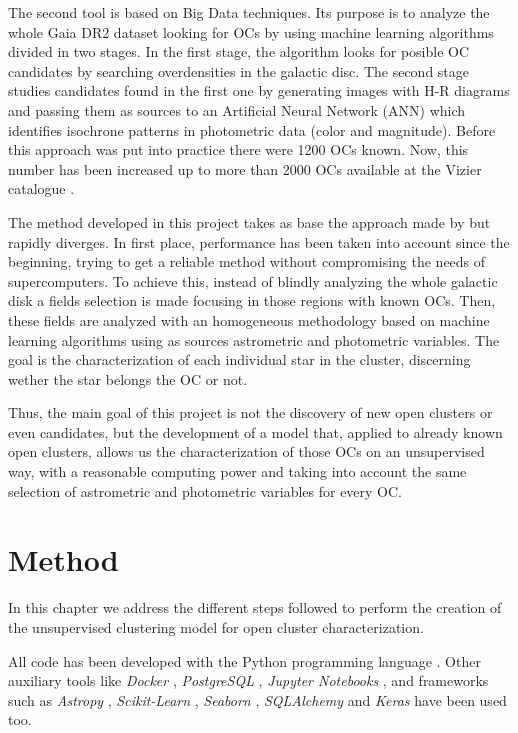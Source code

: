 \documentclass[11pt, a4paper, english]{book}
\begin{document}
The second tool is based on Big Data techniques. Its purpose is to analyze the whole Gaia DR2 dataset looking for OCs by using
machine learning algorithms divided in two stages. In the first stage, the algorithm looks for posible OC candidates by searching
overdensities in the galactic disc.
The second stage studies candidates found in the first one by generating images with H-R diagrams and passing them
as sources to an Artificial Neural Network (ANN) which identifies isochrone patterns in photometric data (color and magnitude).
Before this approach was put into practice there were 1200 OCs known. Now, this number has been increased up to more than 2000 OCs
available at the Vizier catalogue \cite{ochsenbein2000vizier}.

The method developed in this project takes as base the approach made by \citeauthor{castro2020hunting} but rapidly diverges.
In first place, performance has been taken into account since the beginning, trying to get a reliable method without compromising the
needs of supercomputers.
To achieve this, instead of blindly analyzing the whole galactic disk a fields selection is made focusing in those regions with known OCs.
Then, these fields are analyzed with an homogeneous methodology based on machine learning algorithms using as sources astrometric and
photometric variables. The goal is the characterization of each individual star in the cluster, discerning wether the star belongs the OC
or not.

Thus, the main goal of this project is not the discovery of new open clusters or even candidates, but the development of a model that,
applied to already known open clusters, allows us the characterization of those OCs on an unsupervised way, with a reasonable computing
power and taking into account the same selection of astrometric and photometric variables for every OC.


\chapter{Method}

In this chapter we address the different steps followed to perform the creation of the unsupervised clustering model for open cluster characterization.

All code has been developed with the Python programming language \cite{Python3}. Other auxiliary tools like \emph{Docker} \cite{merkel2014docker},
\emph{PostgreSQL} \cite{postgresql}, \emph{Jupyter Notebooks} \cite{Kluyver2016jupyter}, and frameworks such as \emph{Astropy} \cite{astropy:2013} \cite{astropy:2018},
\emph{Scikit-Learn} \cite{scikit-learn}, \emph{Seaborn} \cite{michael_waskom_2017_883859}, \emph{SQLAlchemy} \cite{sqlalchemy} and
\emph{Keras} \cite{chollet2015keras} have been used too.
\end{document}

